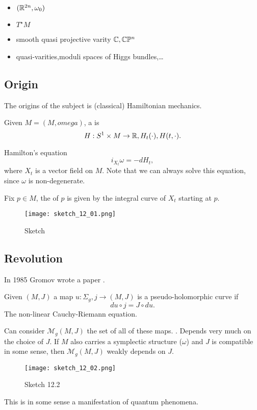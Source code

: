 \begin{example}
    \begin{itemize}
        \item \((\mathbb{R}^{2n},\omega_0)\)
        \item \( T^\star M\)
        \item smooth quasi projective varity \(\mathbb{C},\mathbb{C}\mathbb{P}^n\)
        \item quasi-varities,moduli spaces of Higgs bundles,\dots  
    \end{itemize}
\end{example}

\subsection{Origin}

The origins of the subject is (classical) Hamiltonian mechanics.

Given \(M=(M,omega)\), a  is 
\[H:S^1\times M \to \mathbb{R},H_t(\cdot),H(t,\cdot).\]

Hamilton's equation 
\[i_{X_t}\omega=-dH_t,\]
where \(X_t\) is a vector field on \(M\). Note that we can always solve this equation, since \(\omega\) is non-degenerate.

Fix \(p\in M\), the  of \(p\) is given by the integral curve of 
\(X_t\) starting at \(p\).

\begin{figure}[H]\label{fig:12.1}
    \centering
    \texttt{[image: sketch\_12\_01.png]}
    \caption{Sketch }
\end{figure}

\subsection{Revolution}

In 1985 Gromov wrote a paper .

\begin{definition*}
    Given  \((M,J)\) a map \(u: \Sigma_g,j\to (M,J)\) is a pseudo-holomorphic curve if 
    \[du\circ j = J\circ du.\]
    The non-linear Cauchy-Riemann equation.

    Can consider \(\mathcal{M}_g(M,J)\) the set of all of these maps. . Depends very much on the choice of \(J\).
    If \(M\) also carries a symplectic structure (\(\omega\)) and \(J\) is compatible in some sense, then 
    \(\mathcal{M}_g(M,J)\) weakly depends on \(J\).
    \begin{figure}[H]\label{fig:12.2}
        \centering
        \texttt{[image: sketch\_12\_02.png]}
        \caption{Sketch 12.2}
    \end{figure}
\end{definition*}
This is in some sense a manifestation of quantum phenomena.

